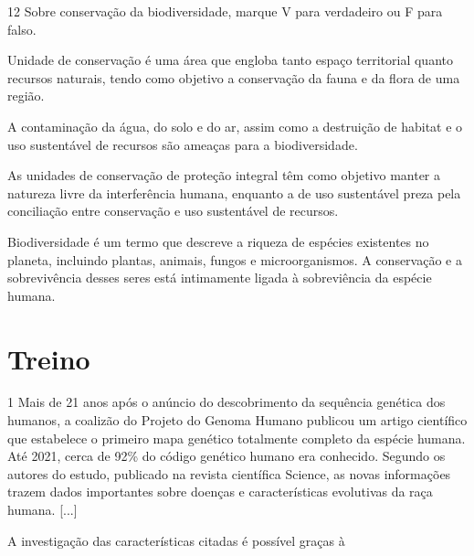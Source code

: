 \num{12}  Sobre conservação da biodiversidade, marque V para verdadeiro ou F para falso.

\begin{boxlist}
\item Unidade de conservação é uma área que engloba tanto espaço
territorial quanto recursos naturais, tendo como objetivo a conservação
da fauna e da flora de uma região. 

\item A contaminação da água, do solo e do ar, assim como a destruição de
habitat e o uso sustentável de recursos são ameaças para a
biodiversidade. 

\item As unidades de conservação de proteção integral têm como objetivo
manter a natureza livre da interferência humana, enquanto a de uso
sustentável preza pela conciliação entre conservação e uso sustentável
de recursos. 

\item Biodiversidade é um termo que descreve a riqueza de espécies
existentes no planeta, incluindo plantas, animais, fungos e
microorganismos. A conservação e a sobrevivência desses seres está
intimamente ligada à sobreviência da espécie humana. 
\end{boxlist}


\section{Treino}

\num{1}  Mais de 21 anos após o anúncio do descobrimento da sequência genética
  dos humanos, a coalizão do Projeto do Genoma Humano publicou um artigo
  científico que estabelece o primeiro mapa genético totalmente completo
  da espécie humana. 
  Até 2021, cerca de 92\% do código genético humano
  era conhecido. Segundo os autores do estudo, publicado na revista
  científica Science, as novas informações trazem dados importantes
  sobre doenças e características evolutivas da raça humana. [...]


A investigação das características citadas é possível graças à

